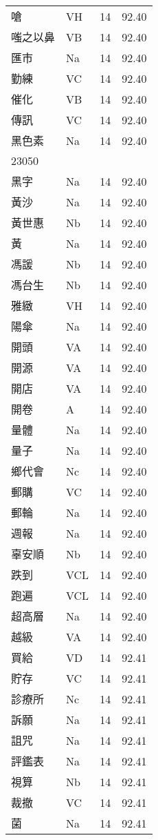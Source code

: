 \documentclass[twocolumn]{book}
\begin{document}
\begin{supertabular}{llrr}
嗆 & VH & 14 &  92.40\\
嗤之以鼻 & VB & 14 &  92.40\\
匯市 & Na & 14 &  92.40\\
勤練 & VC & 14 &  92.40\\
催化 & VB & 14 &  92.40\\
傳訊 & VC & 14 &  92.40\\
黑色素 & Na & 14 &  92.40\\
23050\\
黑字 & Na & 14 &  92.40\\
黃沙 & Na & 14 &  92.40\\
黃世惠 & Nb & 14 &  92.40\\
黃 & Na & 14 &  92.40\\
馮諼 & Nb & 14 &  92.40\\
馮台生 & Nb & 14 &  92.40\\
雅緻 & VH & 14 &  92.40\\
陽傘 & Na & 14 &  92.40\\
開頭 & VA & 14 &  92.40\\
開源 & VA & 14 &  92.40\\
開店 & VA & 14 &  92.40\\
開卷 & A & 14 &  92.40\\
量體 & Na & 14 &  92.40\\
量子 & Na & 14 &  92.40\\
鄉代會 & Nc & 14 &  92.40\\
郵購 & VC & 14 &  92.40\\
郵輪 & Na & 14 &  92.40\\
週報 & Na & 14 &  92.40\\
辜安順 & Nb & 14 &  92.40\\
跌到 & VCL & 14 &  92.40\\
跑遍 & VCL & 14 &  92.40\\
超高層 & Na & 14 &  92.40\\
越級 & VA & 14 &  92.40\\
買給 & VD & 14 &  92.41\\
貯存 & VC & 14 &  92.41\\
診療所 & Nc & 14 &  92.41\\
訴願 & Na & 14 &  92.41\\
詛咒 & Na & 14 &  92.41\\
評鑑表 & Na & 14 &  92.41\\
視算 & Nb & 14 &  92.41\\
裁撤 & VC & 14 &  92.41\\
菌 & Na & 14 &  92.41\\

\end{supertabular}
\end{document}
